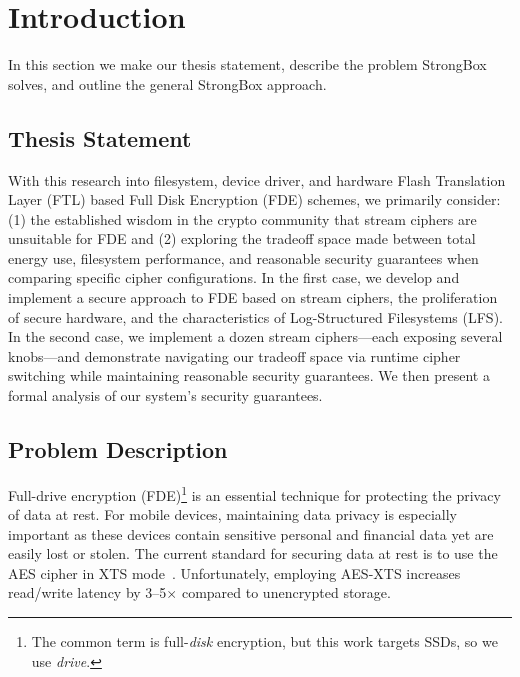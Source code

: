 \chapter{Introduction} \label{chp:introduction}

In this section we make our thesis statement, describe the problem StrongBox
solves, and outline the general StrongBox approach.

\section{Thesis Statement}

With this research into filesystem, device driver, and hardware Flash
Translation Layer (FTL) based Full Disk Encryption (FDE) schemes, we primarily
consider: (1) the established wisdom in the crypto community that stream ciphers
are unsuitable for FDE and (2) exploring the tradeoff space made between total
energy use, filesystem performance, and reasonable security guarantees when
comparing specific cipher configurations. In the first case, we develop and
implement a secure approach to FDE based on stream ciphers, the proliferation of
secure hardware, and the characteristics of Log-Structured Filesystems (LFS). In
the second case, we implement a dozen stream ciphers---each exposing several
knobs---and demonstrate navigating our tradeoff space via runtime cipher
switching while maintaining reasonable security guarantees. We then present a
formal analysis of our system's security guarantees.

\section{Problem Description}

Full-drive encryption (FDE)\footnote{The common term is full-\emph{disk}
encryption, but this work targets SSDs, so we use \emph{drive}.} is an essential
technique for protecting the privacy of data at rest. For mobile devices,
maintaining data privacy is especially important as these devices contain
sensitive personal and financial data yet are easily lost or stolen. The current
standard for securing data at rest is to use the AES cipher in XTS
mode~\cite{XTS, NISTXTS}. Unfortunately, employing AES-XTS increases read/write
latency by 3--5$\times$ compared to unencrypted storage.

